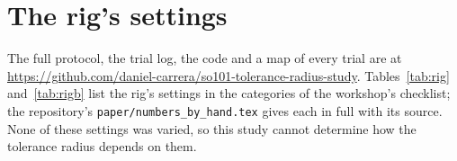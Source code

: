 
\section{The rig's settings}
\label{app:rig}
The full protocol, the trial log, the code and a map of every trial are at \url{https://github.com/daniel-carrera/so101-tolerance-radius-study}. %
Tables~\ref{tab:rig} and~\ref{tab:rigb} list the rig's settings in the categories of the workshop's checklist; the repository's \texttt{paper/numbers\_by\_hand.tex} gives each in full with its source.
None of these settings was varied, so this study cannot determine how the tolerance radius depends on them.


